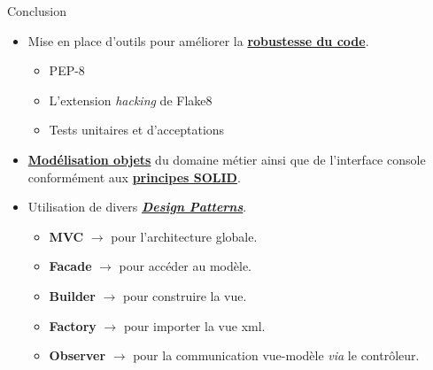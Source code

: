 \begin{frame}{Conclusion}
  \begin{itemize}
  \item Mise en place d'outils pour améliorer la
    \underline{\textbf{robustesse du code}}.
    \begin{itemize}
    \item PEP-8
    \item L'extension \textit{hacking} de Flake8
    \item Tests unitaires et d'acceptations
    \end{itemize}
  \item \underline{\textbf{Modélisation objets}} du domaine métier
    ainsi que de l'interface console conformément aux \underline{\textbf{principes SOLID}}.
  \item Utilisation de divers \underline{\textit{\textbf{Design
        Patterns}}}.
    \begin{itemize}
    \item \textbf{MVC} $\rightarrow$ pour l'architecture globale.
    \item \textbf{Facade} $\rightarrow$ pour accéder au modèle.
    \item \textbf{Builder} $\rightarrow$ pour construire la vue.
    \item \textbf{Factory} $\rightarrow$ pour importer la vue xml.
    \item \textbf{Observer} $\rightarrow$ pour la communication
      vue-modèle \textit{via} le contrôleur.
    \end{itemize}
  \end{itemize}  
\end{frame}



